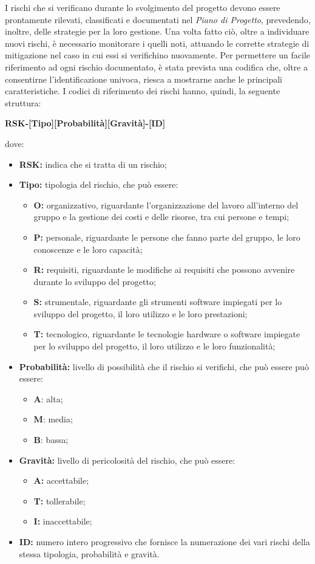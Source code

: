 \begin{itemize}
			I rischi che si verificano durante lo svolgimento del progetto devono essere prontamente rilevati, classificati e documentati nel \textit{Piano di Progetto}, prevedendo, inoltre, delle strategie per la loro gestione. Una volta fatto ciò, oltre a individuare nuovi rischi, è necessario monitorare i quelli noti, attuando le corrette strategie di mitigazione nel caso in cui essi si verifichino nuovamente.
			\newline
			Per permettere un facile riferimento ad ogni rischio documentato, è stata prevista una codifica che, oltre a consentirne l'identificazione univoca, riesca a mostrarne anche le principali caratteristiche. I codici di riferimento dei rischi hanno, quindi, la seguente struttura:
			\centerline{\textbf{RSK-[Tipo][Probabilità][Gravità]-[ID]}}
			dove:
			\begin{itemize}
				\item \textbf{RSK:} indica che si tratta di un rischio;
				\item \textbf{Tipo:} tipologia del rischio, che può essere:
				\begin{itemize}
					\item \textbf{O:} organizzativo, riguardante l'organizzazione del lavoro all'interno del gruppo e la gestione dei costi e delle risorse, tra cui persone e tempi;
					\item \textbf{P:} personale, riguardante le persone che fanno parte del gruppo, le loro conoscenze e le loro capacità; 
					\item \textbf{R:} requisiti, riguardante le modifiche ai requisiti che possono avvenire durante lo sviluppo del progetto;
					\item \textbf{S:} strumentale, riguardante gli strumenti software impiegati per lo sviluppo del progetto, il loro utilizzo e le loro prestazioni;
					\item \textbf{T:} tecnologico, riguardante le tecnologie hardware o software impiegate per lo sviluppo del progetto, il loro utilizzo e le loro funzionalità;	
				\end{itemize}
				\item \textbf{Probabilità:} livello di possibilità che il rischio si verifichi, che può essere può essere:
				\begin{itemize}
					\item \textbf{A}: alta;
					\item \textbf{M}: media;
					\item \textbf{B}: bassa;
				\end{itemize}
				\item \textbf{Gravità:} livello di pericolosità del rischio, che può essere:
				\begin{itemize}
					\item \textbf{A:} accettabile;
					\item \textbf{T:} tollerabile;
					\item \textbf{I:} inaccettabile;		
				\end{itemize}
				\item \textbf{ID:} numero intero progressivo che fornisce la numerazione dei vari rischi della stessa tipologia, probabilità e gravità. 
				

\end{itemize}
\end{itemize}

